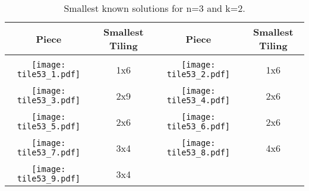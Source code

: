 \documentclass[10pt,a4paper]{article}
\theoremstyle{definition}
\begin{document}
\begin{table}[!htpb]
\centering
\begin{tabular}{|c|c|c|c|}
\hline
Piece & Smallest Tiling & Piece & Smallest Tiling\\ \hline
& & & \\ 
\texttt{[image: tile53\_1.pdf]} & 1x6 & \texttt{[image: tile53\_2.pdf]} & 1x6 \\ \hline
& & & \\ 
\texttt{[image: tile53\_3.pdf]} & 2x9 & \texttt{[image: tile53\_4.pdf]} & 2x6 \\ \hline
& & & \\ 
\texttt{[image: tile53\_5.pdf]} & 2x6 & \texttt{[image: tile53\_6.pdf]} & 2x6 \\ \hline
& & & \\ 
\texttt{[image: tile53\_7.pdf]} & 3x4 & \texttt{[image: tile53\_8.pdf]} & 4x6 \\ \hline
& & & \\ 
\texttt{[image: tile53\_9.pdf]} & 3x4  & & \\ \hline
\end{tabular}
\caption{Smallest known solutions for n=3 and k=2.}
\label{tab:trivial-32}
\end{table}
\end{document}
